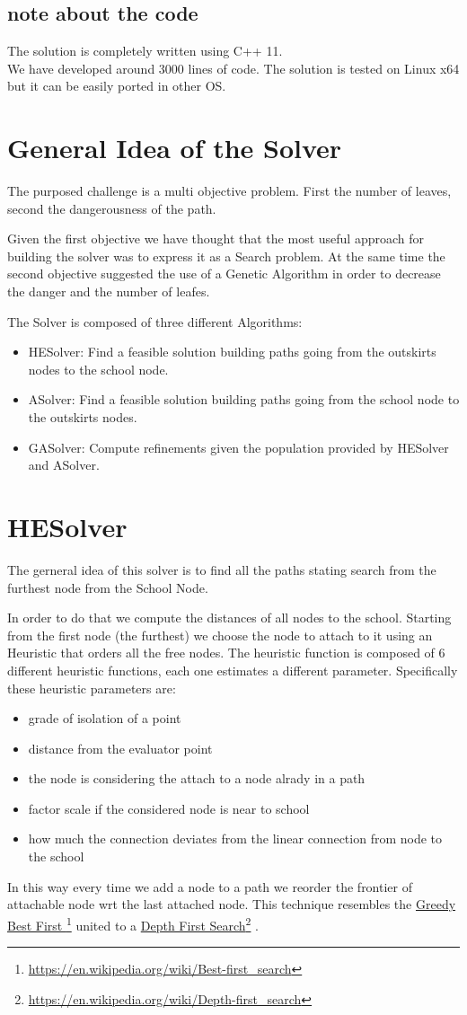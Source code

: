 \documentclass[english]{report}
\newcommand\fnurl[2]{%
	\href{#2}{#1}\footnote{\url{#2}}%
}
\begin{document}
\subsection{note about the code}
The solution is completely written using C++ 11.\\
We have developed around 3000 lines of code.
The solution is tested on Linux x64 but it can be easily ported in other OS.
\section{General Idea of the Solver}
The purposed challenge is a multi objective problem. First the number of leaves, second the dangerousness of the path.
\par Given the first objective we have thought that the most useful approach for building the solver was to express it as  a  Search problem.
At the same time the second objective suggested the use of a Genetic Algorithm in order to decrease the danger and the number of leafes.
\par The Solver is composed of three different Algorithms:
\begin{itemize}
	\item HESolver: Find a feasible solution building paths going from the outskirts nodes to the school node.
	\item ASolver: Find a feasible solution building paths going from the school node to the outskirts nodes.
	\item GASolver: Compute refinements given the population provided by HESolver and ASolver.
\end{itemize}

\section{HESolver}
The gerneral idea of this solver is to find all the paths stating search from the furthest node from the School Node.
\par In order to do that we compute the distances of all nodes to the school. Starting from the first node (the furthest) we choose the node to attach to it using an Heuristic that orders all the free nodes.
The heuristic function is composed of 6 different heuristic functions, each one estimates a different parameter.
Specifically these heuristic parameters are:
\begin{itemize}
	\item grade of isolation of a point
	\item distance from the evaluator point
	\item the node is considering the attach to  a node alrady in a path
	\item factor scale if  the considered node is near to school
	\item how much the connection deviates from the linear connection from node to the school
\end{itemize}
In this way every time we add a node to a path we reorder the frontier of attachable node wrt the last attached node. This technique resembles the \fnurl{Greedy Best First }{https://en.wikipedia.org/wiki/Best-first_search} united to a \fnurl{Depth First Search}{https://en.wikipedia.org/wiki/Depth-first_search}.
\end{document}
